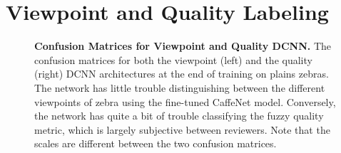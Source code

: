 \section{Viewpoint and Quality Labeling}

\begin{figure}[t]%
    \centering
        \caption[Confusion Matrices for Viewpoint and Quality DCNN]{\textbf{Confusion Matrices for Viewpoint and Quality DCNN.}  The confusion matrices for both the viewpoint (left) and the quality (right) DCNN architectures at the end of training on plains zebras.  The network has little trouble distinguishing between the different viewpoints of zebra using the fine-tuned CaffeNet model.  Conversely, the network has quite a bit of trouble classifying the fuzzy quality metric, which is largely subjective between reviewers.  Note that the scales are different between the two confusion matrices.}
        \label{fig:confusion}
\end{figure}


